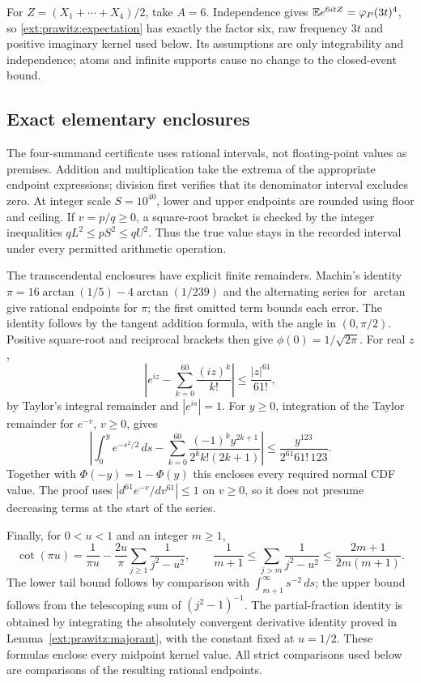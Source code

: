 For $Z=(X_1+\cdots+X_4)/2$, take $A=6$.
Independence gives $\mathbb E e^{6itZ}=\varphi_P(3t)^4$, so
\eqref{ext:prawitz:expectation} has exactly the factor six, raw
frequency $3t$ and positive imaginary kernel used below. Its assumptions
are only integrability and independence; atoms and infinite supports
cause no change to the closed-event bound.
\subsection{Exact elementary enclosures}
\label{ext:elementary-enclosures}

The four-summand certificate uses rational intervals, not floating-point
values as premises. Addition and multiplication take the extrema of
the appropriate endpoint expressions; division first verifies that its
denominator interval excludes zero. At integer scale $S=10^{40}$,
lower and upper endpoints are rounded using floor and ceiling. If
$v=p/q\ge0$, a square-root bracket is checked by the integer inequalities
$qL^2\le pS^2\le qU^2$. Thus the true value stays in the recorded interval
under every permitted arithmetic operation.

The transcendental enclosures have explicit finite remainders. Machin's
identity $\pi=16\arctan(1/5)-4\arctan(1/239)$ and the alternating series
for $\arctan$ give rational endpoints for $\pi$; the first omitted term
bounds each error. The identity follows by the tangent addition formula,
with the angle in $(0,\pi/2)$. Positive square-root and reciprocal
brackets then give $\phi(0)=1/\sqrt{2\pi}$.
For real $z$,
\[
 \left|e^{iz}-\sum_{k=0}^{60}\frac{(iz)^k}{k!}\right|
 \le\frac{|z|^{61}}{61!},
\]
by Taylor's integral remainder and $|e^{is}|=1$.
For $y\ge0$, integration of the Taylor remainder for $e^{-v}$,
$v\ge0$, gives
\[
 \left|\int_0^y e^{-s^2/2}\,ds-
 \sum_{k=0}^{60}\frac{(-1)^k y^{2k+1}}{2^k k!(2k+1)}\right|
 \le\frac{y^{123}}{2^{61}61!\,123}.
\]
Together with $\Phi(-y)=1-\Phi(y)$ this encloses every required normal
CDF value. The proof uses $|d^{61}e^{-v}/dv^{61}|\le1$ on $v\ge0$,
so it does not presume decreasing terms at the start of the series.

Finally, for $0<u<1$ and an integer $m\ge1$,
\[
 \cot(\pi u)=\frac1{\pi u}-\frac{2u}{\pi}
                  \sum_{j\ge1}\frac1{j^2-u^2},\qquad
 \frac1{m+1}\le\sum_{j>m}\frac1{j^2-u^2}
       \le\frac{2m+1}{2m(m+1)}.
\]
The lower tail bound follows by comparison with
$\int_{m+1}^\infty s^{-2}\,ds$; the upper bound follows from the
telescoping sum of $(j^2-1)^{-1}$. The partial-fraction identity is
obtained by integrating the absolutely convergent derivative identity
proved in Lemma~\ref{ext:prawitz:majorant}, with the constant fixed at
$u=1/2$. These formulas enclose every midpoint kernel value.
All strict comparisons used below are comparisons of the resulting
rational endpoints.
